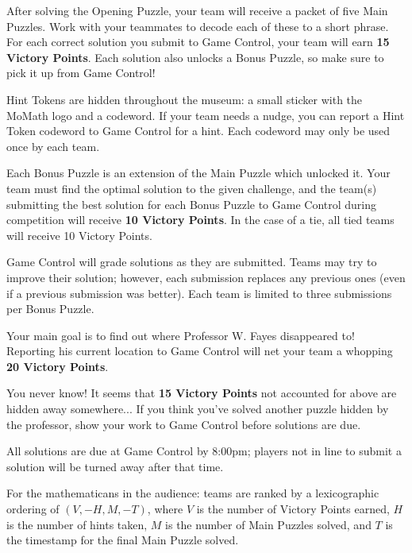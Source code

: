 
After solving the Opening Puzzle, your team will receive a packet of five
Main Puzzles. Work with your teammates to decode each of these to a
short phrase. For each correct solution you submit to Game Control,
your team will earn \textbf{15 Victory Points}. Each solution also unlocks a
Bonus Puzzle, so make sure to pick it up from Game Control!


Hint Tokens are hidden throughout the museum: a small sticker with the
MoMath logo and a codeword. If your team needs a nudge, you can report
a Hint Token codeword to Game Control for a hint. Each codeword may only
be used once by each team.


Each Bonus Puzzle is an extension of the Main Puzzle which unlocked it.
Your team must find the optimal solution to the given challenge, and
the team(s) submitting the best solution for each Bonus Puzzle
to Game Control during competition will receive \textbf{10 Victory Points}.
In the case of a tie, all tied teams will receive 10 Victory Points.

Game Control will grade solutions as they are submitted. Teams may
try to improve their solution; however, each submission replaces
any previous ones (even if a previous submission was better). Each team
is limited to three submissions per Bonus Puzzle.


Your main goal is to find out where Professor W. Fayes disappeared to!
Reporting his current location to Game Control will net your team a whopping
\textbf{20 Victory Points}.


You never know! It seems that \textbf{15 Victory Points} not accounted for above
are hidden away somewhere... If you think you've solved another puzzle hidden
by the professor, show your work to Game Control before solutions are due.


All solutions are due at Game Control by 8:00pm;
players not in line to submit a solution will be turned away after that time.


For the mathematicans in the audience:
teams are ranked by a lexicographic ordering of \((V,-H,M,-T)\), where
\(V\) is the number of Victory Points earned, \(H\) is the number of hints
taken, \(M\) is the number of Main Puzzles solved, and \(T\) is the timestamp
for the final Main Puzzle solved.

